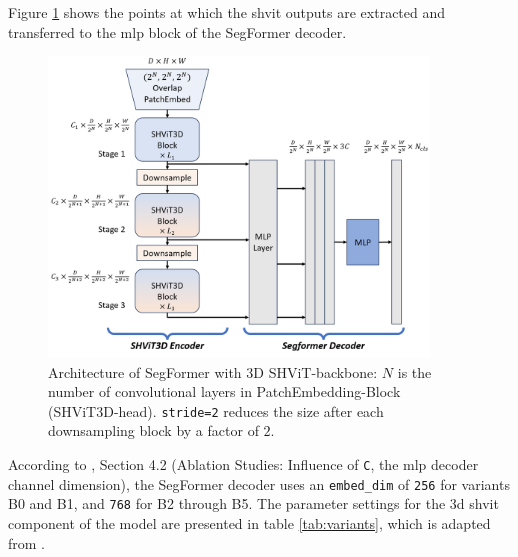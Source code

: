 \medskip

Figure \ref{Architecture_of_SHViT_Segformer} shows the points at which the \gls{shvit} outputs are extracted and transferred to the \gls{mlp} block of the SegFormer decoder.

\begin{figure}[H]
	\centering
	\includegraphics[width=0.9\textwidth]{./images/Architecture_of_SHViT_Segformer.png}
	\caption[Architecture of SegFormer with 3D SHViT-backbone]{Architecture of SegFormer with 3D SHViT-backbone: $N$ is the number of convolutional layers in PatchEmbedding-Block (SHViT3D-head). {\tt stride=2} reduces the size after each downsampling block by a factor of $2$.}
	\label{Architecture_of_SHViT_Segformer}
\end{figure}

According to \cite{xie2021segformersimpleefficientdesign}, Section 4.2 (Ablation Studies: Influence of {\tt C}, the \gls{mlp} decoder channel dimension), the SegFormer decoder uses an {\tt embed\_dim} of {\tt 256} for variants B0 and B1, and {\tt 768} for B2 through B5. The parameter settings for the \gls{3d} \gls{shvit} component of the model are presented in table \ref{tab:variants}, which is adapted from \cite{yun2024shvit, IMvision12}.

